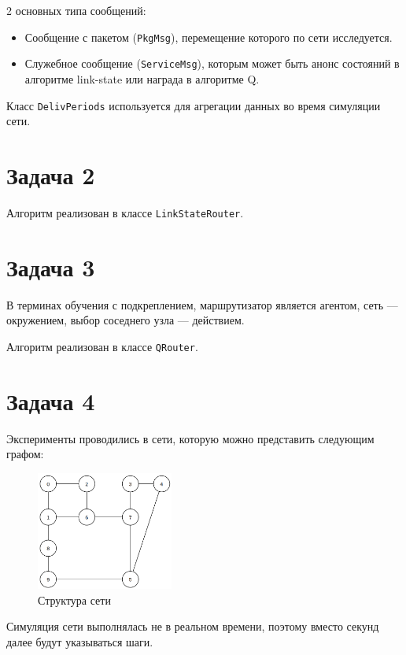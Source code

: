 \documentclass[a4paper]{article}
\begin{document}
2 основных типа сообщений:

\begin{itemize}
    \item  Сообщение с пакетом (\texttt{PkgMsg}), перемещение которого по сети
        исследуется.

    \item Служебное сообщение (\texttt{ServiceMsg}), которым может быть анонс
        состояний в алгоритме link-state или награда в алгоритме Q.
\end{itemize}

Класс \texttt{DelivPeriods} используется для агрегации данных во время
симуляции сети.

\section{Задача 2}

Алгоритм реализован в классе \texttt{LinkStateRouter}.

\section{Задача 3}

В терминах обучения с подкреплением, маршрутизатор является агентом, сеть ---
окружением, выбор соседнего узла --- действием.

Алгоритм реализован в классе \texttt{QRouter}.

\section{Задача 4}

Эксперименты проводились в сети, которую можно представить следующим графом:

\begin{figure}[H]
    \centering
    \includegraphics[width=0.4\textwidth]{figs/network}
    \caption{Структура сети}\label{fig:net}
\end{figure}

Симуляция сети выполнялась не в реальном времени, поэтому вместо секунд далее
будут указываться шаги.
\end{document}
